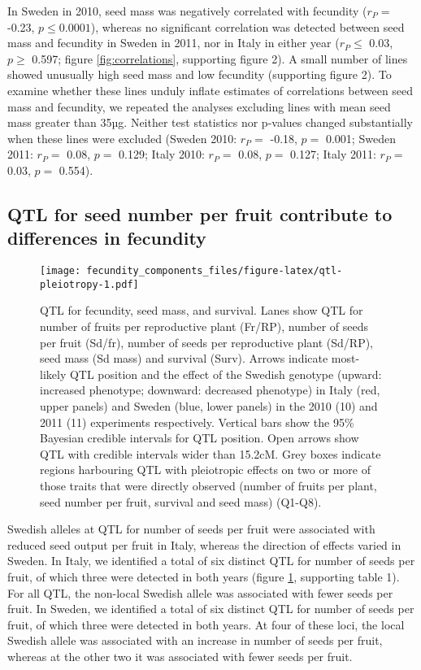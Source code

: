 \documentclass[12pt,]{article}
\begin{document}
In Sweden in 2010, seed mass was negatively correlated with fecundity
(\(r_P=\) -0.23,
\(p \leq 0.0001\)),
whereas no significant correlation was detected between seed mass and fecundity in Sweden in 2011, nor in Italy in either year
(\(r_P \leq\) 0.03,
\(p \geq\) 0.597;
figure \ref{fig:correlations}, supporting figure 2).
A small number of lines showed unusually high seed mass and low fecundity (supporting figure 2).
To examine whether these lines unduly inflate estimates of correlations between seed mass and fecundity, we repeated the analyses excluding lines with mean seed mass greater than 35µg.
Neither test statistics nor p-values changed substantially when these lines were excluded
(Sweden 2010: \(r_P=\) -0.18, \(p=\) 0.001;
Sweden 2011: \(r_P=\) 0.08, \(p=\) 0.129;
Italy 2010: \(r_P=\) 0.08, \(p=\) 0.127;
Italy 2011: \(r_P=\) 0.03, \(p=\) 0.554).

\hypertarget{qtl-for-seed-number-per-fruit-contribute-to-differences-in-fecundity}{%
\subsection{QTL for seed number per fruit contribute to differences in fecundity}\label{qtl-for-seed-number-per-fruit-contribute-to-differences-in-fecundity}}

\begin{figure}
\centering
\texttt{[image: fecundity\_components\_files/figure-latex/qtl-pleiotropy-1.pdf]}
\caption{\label{fig:qtl-pleiotropy}QTL for fecundity, seed mass, and survival. Lanes show QTL for number of fruits per reproductive plant (Fr/RP), number of seeds per fruit (Sd/fr), number of seeds per reproductive plant (Sd/RP), seed mass (Sd mass) and survival (Surv). Arrows indicate most-likely QTL position and the effect of the Swedish genotype (upward: increased phenotype; downward: decreased phenotype) in Italy (red, upper panels) and Sweden (blue, lower panels) in the 2010 (10) and 2011 (11) experiments respectively. Vertical bars show the 95\% Bayesian credible intervals for QTL position. Open arrows show QTL with credible intervals wider than 15.2cM. Grey boxes indicate regions harbouring QTL with pleiotropic effects on two or more of those traits that were directly observed (number of fruits per plant, seed number per fruit, survival and seed mass) (Q1-Q8).}
\end{figure}

Swedish alleles at QTL for number of seeds per fruit were associated with reduced seed output per fruit in Italy, whereas the direction of effects varied in Sweden.
In Italy, we identified a total of six distinct QTL for number of seeds per fruit, of which three were detected in both years (figure \ref{fig:qtl-pleiotropy}, supporting table 1).
For all QTL, the non-local Swedish allele was associated with fewer seeds per fruit.
In Sweden, we identified a total of six distinct QTL for number of seeds per fruit, of which three were detected in both years.
At four of these loci, the local Swedish allele was associated with an increase in number of seeds per fruit, whereas at the other two it was associated with fewer seeds per fruit.
\end{document}
